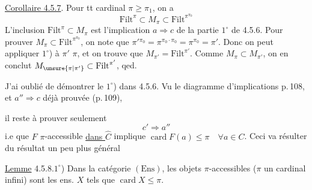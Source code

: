 \uline{Corollaire 4.5.7}. Pour tt cardinal $\pi\geq\pi_1$, on a
\[
\mathrm{Filt}^{\pi}\subset M_\pi\subset\mathrm{Filt}^{\pi^{\pi_0}}
\tag*{(4.5.7.1)}
\]
L'inclusion $\mathrm{Filt}^{\pi}\subset M_\pi$ est l'implication $a\Rightarrow c$ de la partie $1^\circ$ de 4.5.6. Pour prouver $M_\pi\subset\mathrm{Filt}^{\pi^{\pi_0}}$,     on note que $\pi'{}^{\pi_0}=\pi^{\pi_0\cdot\pi_0}=\pi^{\pi_0}=\pi'$. Donc on peut appliquer $1^\circ$) à $\pi'$  $\pi$, et on trouve que $M_{\pi'}=\mathrm{Filt}^{\pi'}$. Comme $M_\pi\subset M_{\pi'}$, on en conclut $M_{\unsure{\pi|\pi'}}\subset\mathrm{Filt}^{\pi'}$, qed.

J'ai oublié de démontrer le $1^\circ$) dans 4.5.6. Vu le diagramme d'implications  p.\,108, et  $a''\Rightarrow c$ déjà prouvée (p.\,109),

il reste à prouver seulement
\[
c'\Rightarrow a''
\]
i.e que $F$ $\pi$-accessible \uline{dans $\widehat C$} implique $\operatorname{card}F(a)\leq\pi\quad\forall a\in C$. Ceci va résulter du résultat un peu plus général

\uline{Lemme} 4.5.8.\quad $1^\circ$) Dans la catégorie  $(\mathrm{Ens})$, les objets $\pi$-accessibles ($\pi$ un cardinal infini) sont les ens. $X$ tels que $\operatorname{card}X\leq\pi$.

